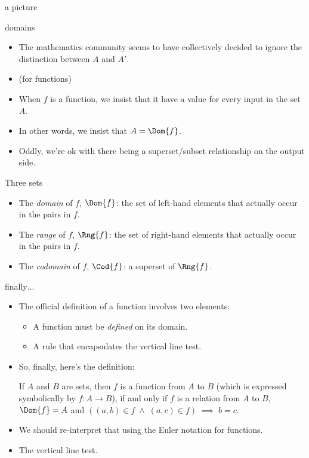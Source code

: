 \documentclass[handout,landscape]{beamer}
\begin{document}
\begin{frame}{a picture}

\end{frame}

\begin{frame}{domains}
\begin{itemize}
\item The mathematics community seems to have collectively decided to ignore the distinction between $A$ and $A'$. \pause
\item (for functions) \pause
\item When $f$ is a function, we insist that it have a value for every input in the set $A$.\pause
\item In other words, we insist that $A = \Dom{f}$.\pause
\item Oddly, we're ok with there being a superset/subset relationship on the output side.
\end{itemize}
\end{frame}


\begin{frame}{Three sets}
\begin{itemize}
\item The {\em domain} of $f$, $\Dom{f}$:\pause \newline
the set of left-hand elements that actually occur in the pairs in $f$. \pause
\item The {\em range} of $f$, $\Rng{f}$: \pause \newline
the set of right-hand elements that actually occur in the pairs in $f$. \pause
\item The {\em codomain} of $f$, $\Cod{f}$: \pause \newline
a superset of $\Rng{f}$.
\end{itemize}
\end{frame}

\begin{frame}{finally$\ldots$}
\begin{itemize}
\item The official definition of a function involves two elements:\pause
\begin{itemize}
  \item A function must be {\em defined} on its domain. \pause
  \item A rule that encapsulates the vertical line test. \pause
\end{itemize}
\item So, finally, here's the definition: \pause

\begin{defi}
If $A$ and $B$ are sets, then $f$ is a function from $A$ to $B$ (which
is expressed symbolically by $f:A\longrightarrow B$), if and only if
$f$ is a relation from $A$ to $B$, $\Dom{f}=A$ and $((a,b) \in f \; \land \; (a,c) \in f) \; \implies \; b=c$.
\end{defi}
\item We should re-interpret that using the Euler notation for functions.\pause
\item The vertical line test.
\end{itemize}
\end{frame}
\end{document}
